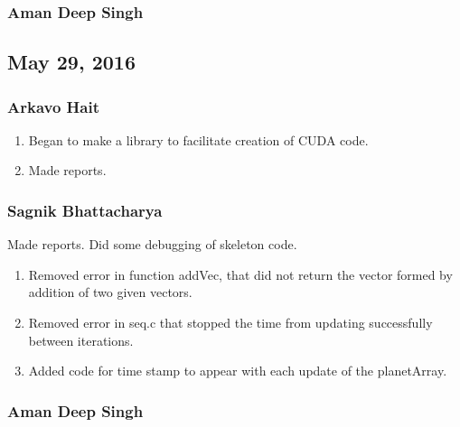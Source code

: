 \documentclass{article}
\begin{document}
\subsubsection*{Aman Deep Singh}
\subsection*{May 29, 2016}
\subsubsection*{Arkavo Hait}
\begin{enumerate}
	\item Began to make a library to facilitate creation of CUDA code.
	\item Made reports.
\end{enumerate}
\subsubsection*{Sagnik Bhattacharya}
Made reports. Did some debugging of skeleton code.
\begin{enumerate}
	\item Removed error in function addVec, that did not return the vector formed by addition of two given vectors.
	\item Removed error in seq.c that stopped the time from updating successfully between iterations.
	\item Added code for time stamp to appear with each update of the planetArray.
\end{enumerate}
\subsubsection*{Aman Deep Singh}
\begin{comment}
\section{What we will do}
Convert the C code to CUDA code to be essential in Parallel computing
Create a GUI to make things visual.
Add other forces and their effects in the future.
We are still workin on the basics of CUDA programming and will covert it to CUDA language soon.
Converting the initial code to a function library to ease up the process and debugging
\end{comment}
\end{document}
